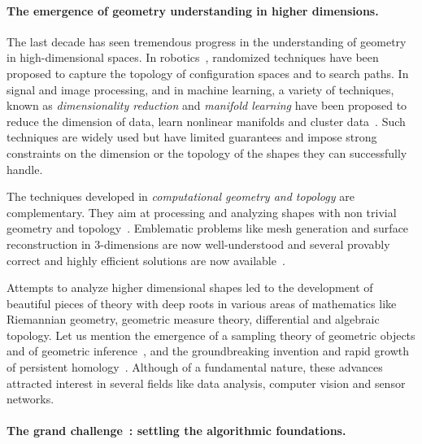 \paragraph{The emergence of geometry understanding in higher dimensions.}
The last decade has seen tremendous progress in  the understanding of geometry in high-dimensional spaces. In robotics~\cite{sml-pa-2006}, randomized techniques have been proposed to capture the topology of configuration spaces and to search paths. In signal and image processing, and in machine learning, a variety of techniques, known as {\em dimensionality reduction} and {\em manifold learning} have been proposed to reduce the dimension of data, learn nonlinear manifolds and cluster data~\cite{hs-fmmds-2006}. %
Such techniques are widely used but have limited guarantees and 
impose strong constraints on the dimension or the topology of the shapes they can successfully handle. 

The techniques developed in {\em computational geometry and topology}  are complementary. They aim at processing and analyzing shapes with non trivial geometry and topology~\cite{hh-ct-2010}. 
Emblematic problems like mesh generation and surface reconstruction in 3-dimensions are now well-understood and several provably correct and highly efficient solutions are now available~\cite{geometrica-ecg-book}. 

Attempts to analyze higher dimensional shapes led to the development of beautiful pieces of theory with deep roots in various areas of mathematics like Riemannian geometry, geometric measure theory, differential and algebraic topology. Let us mention  the emergence of a sampling theory of geometric objects and of geometric inference~\cite{geometrica-ccl09}, and the groundbreaking invention and rapid growth of persistent homology~\cite{eh-ph-2008}.
Although of a fundamental nature, these advances 
attracted  interest in several fields like data analysis, computer vision and sensor networks.

\paragraph{The grand challenge~: settling the algorithmic foundations.}

